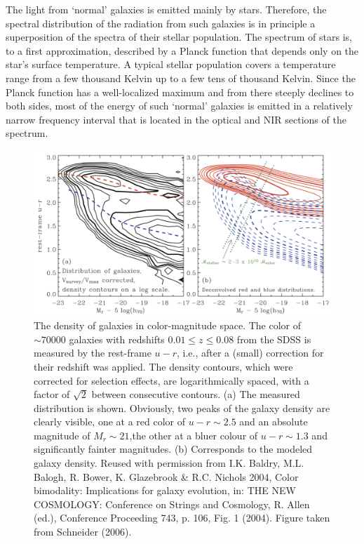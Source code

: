 \documentclass[a4paper,10pt]{article}
\begin{document}
{\noindent}The light from `normal' galaxies is emitted mainly by stars. Therefore, the spectral distribution of the radiation from such galaxies is in principle a superposition of the spectra of their stellar population. The spectrum of stars is, to a first approximation, described by a Planck function that depends only on the star's surface temperature. A typical stellar population covers a temperature range from a few thousand Kelvin up to a few tens of thousand Kelvin. Since the Planck function has a well-localized maximum and from there steeply declines to both sides, most of the energy of such `normal' galaxies is emitted in a relatively narrow frequency interval that is located in the optical and NIR sections of the spectrum.

\begin{figure}[t]
    \centering
    \includegraphics[width=16cm]{figures/SDSSCMD.png}
    \caption{\footnotesize{The density of galaxies in color-magnitude space. The color of $\sim70000$ galaxies with redshifts $0.01\leq z\leq0.08$ from the SDSS is measured by the rest-frame $u-r$, i.e., after a (small) correction for their redshift was applied. The density contours, which were corrected for selection effects, are logarithmically spaced, with a factor of $\sqrt{2}$ between consecutive contours. (a) The measured distribution is shown. Obviously, two peaks of the galaxy density are clearly visible, one at a red color of $u-r\sim2.5$ and an absolute magnitude of $M_r\sim21$,the other at a bluer colour of $u-r\sim1.3$ and significantly fainter magnitudes. (b) Corresponds to the modeled galaxy density. Reused with permission from I.K. Baldry, M.L. Balogh, R. Bower, K. Glazebrook \& R.C. Nichols 2004, Color bimodality: Implications for galaxy evolution, in: THE NEW COSMOLOGY: Conference on Strings and Cosmology, R. Allen (ed.), Conference Proceeding 743, p. 106, Fig. 1 (2004). Figure taken from Schneider (2006).}}
    \label{fig:sdsscmd}
\end{figure}
\end{document}
